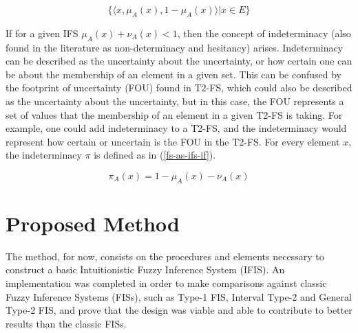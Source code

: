\documentclass[conference]{IEEEtran}
\begin{document}
\begin{equation}
  \label{ifs-form}
  \{ \langle x, \mu_{A}(x), 1 - \mu_{A}(x) \rangle | x \in E \}
\end{equation}

If for a given IFS $\mu_{A}(x) + \nu_{A}(x) < 1$, then the concept of
indeterminacy (also found in the literature as non-determinacy and
hesitancy) arises. Indeterminacy can be described as the
uncertainty about the uncertainty, or how certain one can be about the
membership of an element in a given set. This can be confused by the
footprint of uncertainty (FOU) found in T2-FS, which could also be
described as the uncertainty about the uncertainty, but in this case,
the FOU represents a set of values that the membership of an element
in a given T2-FS is taking. For example, one could add indeterminacy
to a T2-FS, and the indeterminacy would represent how certain or
uncertain is the FOU in the T2-FS. For every element $x$, the
indeterminacy $\pi$ is defined as in (\ref{fs-as-ifs-if}).

\begin{equation}
  \label{fs-as-ifs-if}
  \pi_{A}(x) = 1 - \mu_{A}(x) - \nu_{A}(x)
\end{equation}



\section{Proposed Method}
\label{proposed-method}
The method, for now, consists on the procedures and elements
necessary to construct a basic Intuitionistic Fuzzy Inference System
(IFIS). %
An implementation was completed in order to make comparisons against
classic Fuzzy Inference Systems (FISs), such as Type-1 FIS, Interval
Type-2 and General Type-2 FIS, and prove that
the design was viable and able to contribute to better results than
the classic FISs.
\end{document}
